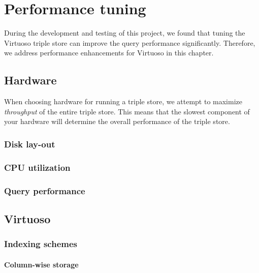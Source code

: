 \chapter{Performance tuning}

  During the development and testing of this project, we found that tuning the
  Virtuoso triple store can improve the query performance significantly.
  Therefore, we address performance enhancements for Virtuoso in this chapter.

\section{Hardware}

  When choosing hardware for running a triple store, we attempt to maximize
  \emph{throughput} of the entire triple store.  This means that the slowest
  component of your hardware will determine the overall performance of the
  triple store.

\subsection{Disk lay-out}

\subsection{CPU utilization}

\subsection{Query performance}

\section{Virtuoso}

\subsection{Indexing schemes}

\subsubsection{Column-wise storage}

